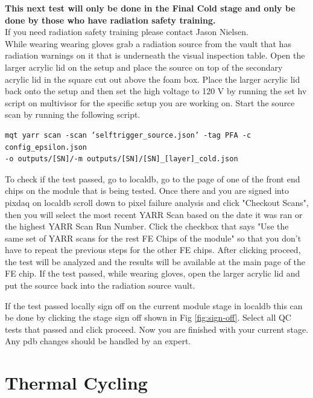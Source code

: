 \documentclass[12pt]{article}
\begin{document}
\textbf{This next test will only be done in the Final Cold stage and only be done by those who have radiation safety training.}\\

If you need radiation safety training please contact Jason Nielsen. \\

While wearing wearing gloves grab a radiation source from the vault that has radiation warnings on it that is underneath the visual inspection table. Open the larger acrylic lid on the setup and place the source on top of the secondary acrylic lid in the square cut out above the foam box. Place the larger acrylic lid back onto the setup and then set the high voltage to 120 V by running the set hv script on multivisor for the specific setup you are working on. Start the source scan by running the following script. 

\begin{verbatim}
mqt yarr scan -scan ‘selftrigger_source.json’ -tag PFA -c config_epsilon.json 
-o outputs/[SN]/-m outputs/[SN]/[SN]_[layer]_cold.json  
\end{verbatim}

To check if the test passed, go to localdb, go to the page of one of the front end chips on the module that is being tested. Once there and you are signed into pixdaq on localdb scroll down to pixel failure analysis and click "Checkout Scans", then you will select the most recent YARR Scan based on the date it was ran or the highest YARR Scan Run Number. Click the checkbox that says "Use the same set of YARR scans for the rest FE Chips of the module" so that you don't have to repeat the previous steps for the other FE chips. After clicking proceed, the test will be analyzed and the results will be available at the main page of the FE chip. If the test passed, while wearing gloves, open the larger acrylic lid and put the source back into the radiation source vault. 

If the test passed locally sign off on the current module stage in localdb this can be done by clicking the stage sign off shown in Fig \ref{fig:sign-off}. Select all QC tests that passed and click proceed. Now you are finished with your current stage. Any pdb changes should be handled by an expert. 

\section{Thermal Cycling}
\end{document}
